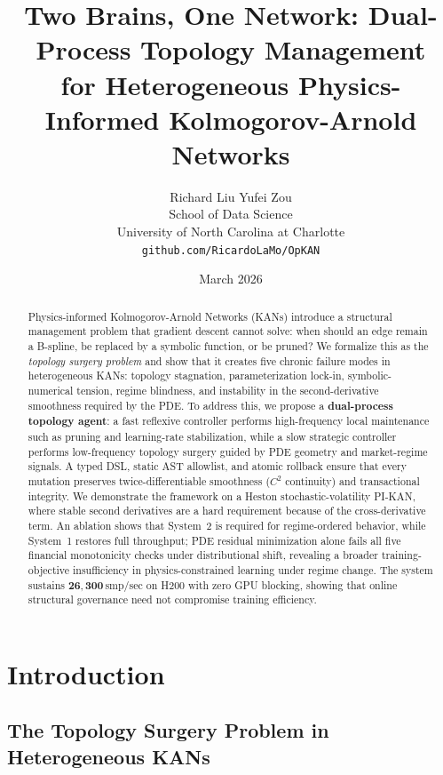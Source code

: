 \documentclass[11pt,a4paper]{article}
\title{\textbf{Two Brains, One Network: Dual-Process Topology Management\\for Heterogeneous Physics-Informed Kolmogorov-Arnold Networks}}
\author{
  Richard Liu \quad Yufei Zou \\
  School of Data Science \\
  University of North Carolina at Charlotte \\
  \texttt{github.com/RicardoLaMo/OpKAN}
}
\date{March 2026}
\begin{document}
\maketitle

\begin{abstract}
Physics-informed Kolmogorov-Arnold Networks (KANs) introduce a structural management
problem that gradient descent cannot solve: when should an edge remain a B-spline, be
replaced by a symbolic function, or be pruned? We formalize this as the \emph{topology
surgery problem} and show that it creates five chronic failure modes in heterogeneous
KANs: topology stagnation, parameterization lock-in, symbolic-numerical tension, regime
blindness, and instability in the second-derivative smoothness required by the PDE. To
address this, we propose a \textbf{dual-process topology agent}: a fast reflexive
controller performs high-frequency local maintenance such as pruning and learning-rate
stabilization, while a slow strategic controller performs low-frequency topology surgery
guided by PDE geometry and market-regime signals. A typed DSL, static AST allowlist, and
atomic rollback ensure that every mutation preserves twice-differentiable smoothness
($C^2$ continuity) and transactional integrity. We demonstrate the framework on a Heston
stochastic-volatility PI-KAN, where stable second derivatives are a hard requirement
because of the cross-derivative term. An ablation shows that System~2 is required for
regime-ordered behavior, while System~1 restores full throughput; PDE residual
minimization alone fails all five financial monotonicity checks under distributional
shift, revealing a broader training-objective insufficiency in physics-constrained
learning under regime change. The system sustains $\mathbf{26{,}300}$\,smp/sec on H200
with zero GPU blocking, showing that online structural governance need not compromise
training efficiency.
\end{abstract}

\section{Introduction}
\label{sec:intro}

\subsection{The Topology Surgery Problem in Heterogeneous KANs}
\label{sec:intro:surgery}
\end{document}
